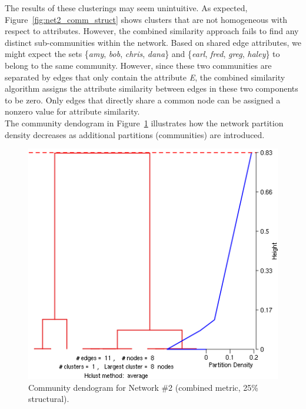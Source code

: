 \documentclass{report} %
\begin{document}
\vspace{-.8em}
The results of these clusterings may seem unintuitive. As expected, Figure~\ref{fig:net2_comm_struct} shows clusters that are not homogeneous with respect to attributes. However, the combined similarity approach fails to find any distinct sub-communities within the network. Based on shared edge attributes, we might expect the sets \{\textit{amy}, \textit{bob}, \textit{chris}, \textit{dana}\} and \{\textit{earl}, \textit{fred}, \textit{greg}, \textit{haley}\} to belong to the same community. However, since these two communities are separated by edges that only contain the attribute \textit{E}, the combined similarity algorithm assigns the attribute similarity between edges in these two components to be zero. Only edges that directly share a common node can be assigned a nonzero value for attribute similarity.\\

The community dendogram in Figure~\ref{fig:net2_dend} illustrates how the network partition density decreases as additional partitions (communities) are introduced.
\vspace{-.36em}




\begin{figure}[htp!]
  \centering
  \includegraphics[width=0.5\linewidth]{toy3/ea/lc_0.25.png}
  \caption{Community dendogram for Network \#2 (combined metric, 25\% structural).}
  \label{fig:net2_dend}
\end{figure}
\end{document}
